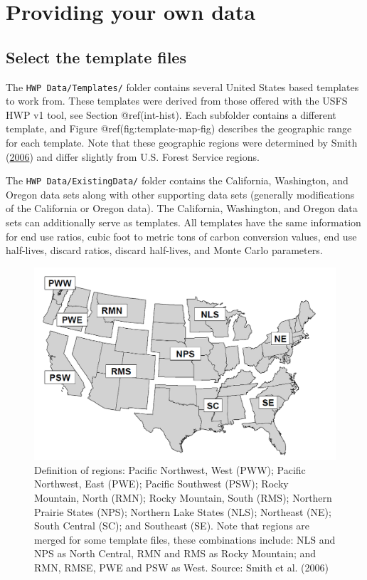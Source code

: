 \documentclass[
  openany]{book}
\begin{document}
\hypertarget{own-prov}{%
\section{Providing your own data}\label{own-prov}}

\hypertarget{own-prov-temp}{%
\subsection{Select the template files}\label{own-prov-temp}}

The \texttt{HWP\ Data/Templates/} folder contains several United States
based templates to work from. These templates were derived from those
offered with the USFS HWP v1 tool, see Section @ref(int-hist). Each
subfolder contains a different template, and Figure
@ref(fig:template-map-fig) describes the geographic range for each
template. Note that these geographic regions were determined by Smith
(\protect\hyperlink{ref-smith2006}{2006}) and differ slightly from U.S.
Forest Service regions.

The \texttt{HWP\ Data/ExistingData/} folder contains the California,
Washington, and Oregon data sets along with other supporting data sets
(generally modifications of the California or Oregon data). The
California, Washington, and Oregon data sets can additionally serve as
templates. All templates have the same information for end use ratios,
cubic foot to metric tons of carbon conversion values, end use
half-lives, discard ratios, discard half-lives, and Monte Carlo
parameters.

\begin{figure}
\includegraphics[width=1\linewidth]{images/regions_map} \caption{Definition of regions: Pacific Northwest, West (PWW); Pacific Northwest, East (PWE); Pacific Southwest (PSW); Rocky Mountain, North (RMN); Rocky Mountain, South (RMS); Northern Prairie States (NPS); Northern Lake States (NLS); Northeast (NE); South Central (SC); and Southeast (SE).  Note that regions are merged for some template files, these combinations include: NLS and NPS as North Central, RMN and RMS as Rocky Mountain; and RMN, RMSE, PWE and PSW as West. Source: Smith et al. (2006)}\label{fig:template-map-fig}
\end{figure}
\end{document}
